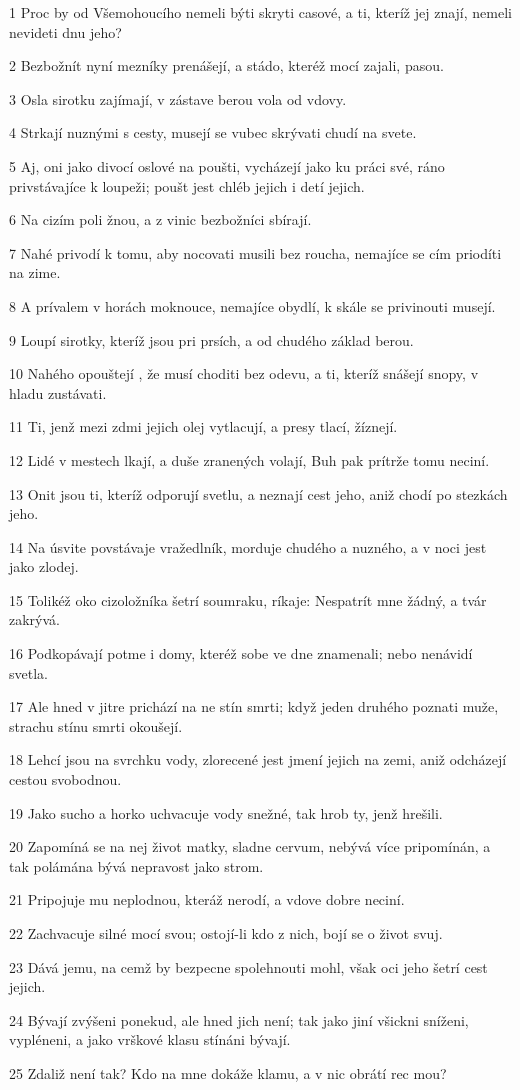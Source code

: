 \par 1 Proc by od Všemohoucího nemeli býti skryti casové, a ti, kteríž jej znají, nemeli nevideti dnu jeho?
\par 2 Bezbožnít nyní mezníky prenášejí, a stádo, kteréž mocí zajali, pasou.
\par 3 Osla sirotku zajímají, v zástave berou vola od vdovy.
\par 4 Strkají nuznými s cesty, musejí se vubec skrývati chudí na svete.
\par 5 Aj, oni jako divocí oslové na poušti, vycházejí jako ku práci své, ráno privstávajíce k loupeži; poušt jest chléb jejich i detí jejich.
\par 6 Na cizím poli žnou, a z vinic bezbožníci sbírají.
\par 7 Nahé privodí k tomu, aby nocovati musili bez roucha, nemajíce se cím priodíti na zime.
\par 8 A prívalem v horách moknouce, nemajíce obydlí, k skále se privinouti musejí.
\par 9 Loupí sirotky, kteríž jsou pri prsích, a od chudého základ berou.
\par 10 Nahého opouštejí , že musí choditi bez odevu, a ti, kteríž snášejí snopy, v hladu zustávati.
\par 11 Ti, jenž mezi zdmi jejich olej vytlacují, a presy tlací, žíznejí.
\par 12 Lidé v mestech lkají, a duše zranených volají, Buh pak prítrže tomu neciní.
\par 13 Onit jsou ti, kteríž odporují svetlu, a neznají cest jeho, aniž chodí po stezkách jeho.
\par 14 Na úsvite povstávaje vražedlník, morduje chudého a nuzného, a v noci jest jako zlodej.
\par 15 Tolikéž oko cizoložníka šetrí soumraku, ríkaje: Nespatrít mne žádný, a tvár zakrývá.
\par 16 Podkopávají potme i domy, kteréž sobe ve dne znamenali; nebo nenávidí svetla.
\par 17 Ale hned v jitre prichází na ne stín smrti; když jeden druhého poznati muže, strachu stínu smrti okoušejí.
\par 18 Lehcí jsou na svrchku vody, zlorecené jest jmení jejich na zemi, aniž odcházejí cestou svobodnou.
\par 19 Jako sucho a horko uchvacuje vody snežné, tak hrob ty, jenž hrešili.
\par 20 Zapomíná se na nej život matky, sladne cervum, nebývá více pripomínán, a tak polámána bývá nepravost jako strom.
\par 21 Pripojuje mu neplodnou, kteráž nerodí, a vdove dobre neciní.
\par 22 Zachvacuje silné mocí svou; ostojí-li kdo z nich, bojí se o život svuj.
\par 23 Dává jemu, na cemž by bezpecne spolehnouti mohl, však oci jeho šetrí cest jejich.
\par 24 Bývají zvýšeni ponekud, ale hned jich není; tak jako jiní všickni sníženi, vypléneni, a jako vrškové klasu stínáni bývají.
\par 25 Zdaliž není tak? Kdo na mne dokáže klamu, a v nic obrátí rec mou?

